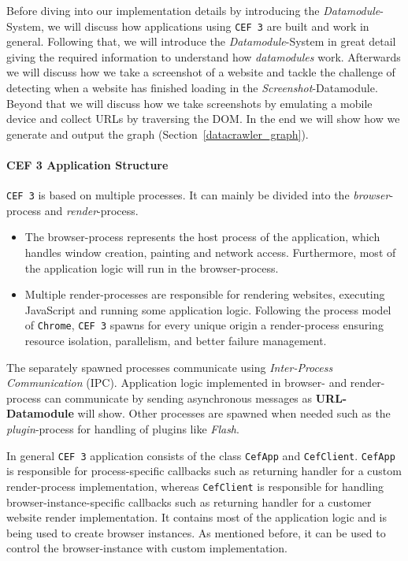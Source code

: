 Before diving into our implementation details by introducing the \textit{Datamodule}-System, we will discuss how applications using \texttt{CEF 3} are built and work in general. Following that, we will introduce the \textit{Datamodule}-System in great detail giving the required information to understand how \textit{datamodules} work. Afterwards we will discuss how we take a screenshot of a website and tackle the challenge of detecting when a website has finished loading in the \textit{Screenshot}-Datamodule. Beyond that we will discuss how we take screenshots by emulating a mobile device and collect URLs by traversing the DOM. In the end we will show how we generate and output the graph (Section~\ref{datacrawler_graph}).

\paragraph*{CEF 3 Application Structure}
\label{datacrawler_cef_architecture}
\texttt{CEF 3} is based on multiple processes. It can mainly be divided into the \textit{browser}-process and \textit{render}-process.

\begin{itemize}
	\item The browser-process represents the host process of the application, which handles window creation, painting and network access. Furthermore, most of the application logic will run in the browser-process. 
	\item Multiple render-processes are responsible for rendering websites, executing JavaScript and running some application logic. Following the process model of \texttt{Chrome}, \texttt{CEF 3} spawns for every unique origin a render-process ensuring resource isolation, parallelism, and better failure management.
\end{itemize}

The separately spawned processes communicate using \textit{Inter-Process Communication} (IPC). Application logic implemented in browser- and render-process can communicate by sending asynchronous messages as \textbf{URL-Datamodule} will show. Other processes are spawned when needed such as the \textit{plugin}-process for handling of plugins like \textit{Flash}.

In general \texttt{CEF 3} application consists of the class \texttt{CefApp} and \texttt{CefClient}. \texttt{CefApp} is responsible for process-specific callbacks such as returning handler for a custom render-process implementation, whereas \texttt{CefClient} is responsible for handling browser-instance-specific callbacks such as returning handler for a customer website render implementation. It contains most of the application logic and is being used to create browser instances. As mentioned before, it can be used to control the browser-instance with custom implementation.


